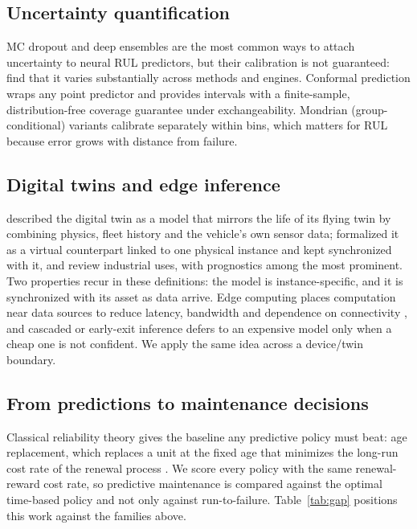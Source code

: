 \documentclass[preprint,12pt,authoryear]{elsarticle}
\begin{document}
\subsection{Uncertainty quantification}
MC dropout \citep{gal2016dropout} and deep ensembles \citep{lakshminarayanan2017ensembles} are the most common ways to attach uncertainty to neural RUL predictors, but their calibration is not guaranteed: \citet{basora2023uqbench} find that it varies substantially across methods and engines. Conformal prediction \citep{vovk2005alrw,angelopoulos2021gentle} wraps any point predictor and provides intervals with a finite-sample, distribution-free coverage guarantee under exchangeability. Mondrian (group-conditional) variants calibrate separately within bins, which matters for RUL because error grows with distance from failure.

\subsection{Digital twins and edge inference}
\citet{glaessgen2012digital} described the digital twin as a model that mirrors the life of its flying twin by combining physics, fleet history and the vehicle's own sensor data; \citet{grieves2017digital} formalized it as a virtual counterpart linked to one physical instance and kept synchronized with it, and \citet{tao2019digital} review industrial uses, with prognostics among the most prominent. Two properties recur in these definitions: the model is instance-specific, and it is synchronized with its asset as data arrive. Edge computing places computation near data sources to reduce latency, bandwidth and dependence on connectivity \citep{shi2016edge}, and cascaded or early-exit inference \citep{teerapittayanon2016branchynet} defers to an expensive model only when a cheap one is not confident. We apply the same idea across a device/twin boundary.

\subsection{From predictions to maintenance decisions}
Classical reliability theory gives the baseline any predictive policy must beat: age replacement, which replaces a unit at the fixed age that minimizes the long-run cost rate of the renewal process \citep{barlow1960optimum}. We score every policy with the same renewal-reward cost rate, so predictive maintenance is compared against the optimal time-based policy and not only against run-to-failure. Table~\ref{tab:gap} positions this work against the families above.
\end{document}
